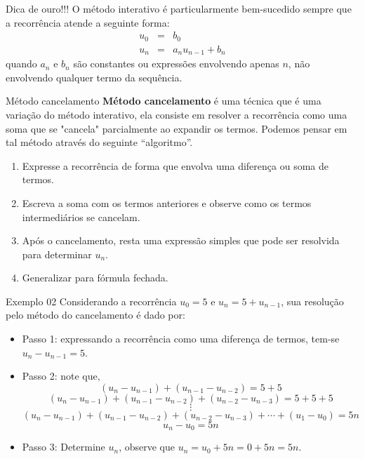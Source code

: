 \begin{frame}{Dica de ouro!!!}
  O método interativo é particularmente bem-sucedido sempre que a recorrência atende a seguinte forma:
  \begin{eqnarray*}
    u_0 & = & b_0\\
    u_n & = & a_n u_{n-1} + b_n
  \end{eqnarray*}
  quando $a_n$ e $b_n$ são constantes ou expressões envolvendo apenas $n$, não envolvendo qualquer termo da sequência.
\end{frame}

\begin{frame}{Método cancelamento}
  \textbf{Método cancelamento} é uma técnica que é uma variação do método interativo, ela consiste em resolver a recorrência como uma soma que se "cancela" parcialmente ao expandir os termos. Podemos pensar em tal método através do seguinte ``algoritmo''.
  \begin{enumerate}
    \item Expresse a recorrência de forma que envolva uma diferença ou soma de termos.
    \item Escreva a soma com os termos anteriores e observe como os termos intermediários se cancelam.
    \item Após o cancelamento, resta uma expressão simples que pode ser resolvida para determinar $u_n$.
    \item Generalizar para fórmula fechada.
  \end{enumerate}
\end{frame}

\begin{frame}{Exemplo 02}
  Considerando a recorrência $u_0 = 5$ e $u_{n} = 5 + u_{n - 1}$, sua resolução pelo método do cancelamento é dado por:
  \pause
  \begin{itemize}
    \item Passo 1: expressando a recorrência como uma diferença de termos, tem-se $u_n - u_{n-1} = 5$.
    \item Passo 2: note que,
    $$(u_n - u_{n-1}) + (u_{n-1} - u_{n-2})  = 5 + 5$$
    $$(u_n - u_{n-1}) + (u_{n-1} - u_{n-2}) + (u_{n-2} - u_{n-3})   = 5 + 5 + 5$$
    $$\vdots$$
    $$(u_n - u_{n-1}) + (u_{n-1} - u_{n-2}) + (u_{n-2} - u_{n-3}) + \cdots + (u_1 - u_0) =  5n$$
    $$u_n - u_0  =  5n$$\pause
    \item Passo 3: Determine $u_n$, observe que $u_n = u_0 + 5n  =  0 + 5n = 5n$.
  \end{itemize}
\end{frame}

